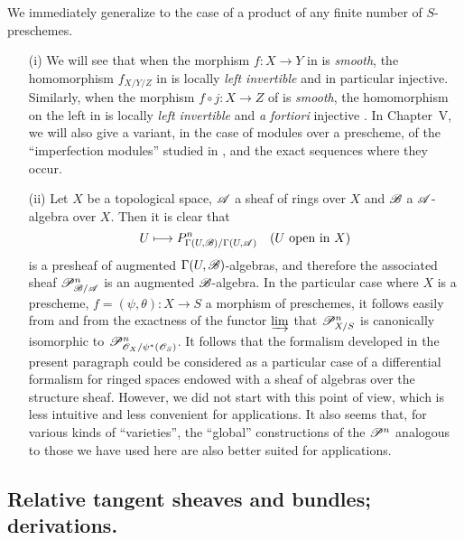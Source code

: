We immediately generalize  to the case of a product of any finite number of $S$-preschemes.

\begin{remarks}[16.4.24]
\label{IV.16.4.24}
\medskip\noindent
\begin{enumerate}
  \item[(i)] We will see  that when the morphism $f: X \to Y$ in  is \emph{smooth}, the homomorphism $f_{X/Y/Z}$ in  is locally \emph{left invertible} and in particular injective.
  Similarly, when the morphism $f \circ j: X \to Z$ of  is \emph{smooth}, the homomorphism on the left in  is locally \emph{left invertible} and \textit{a fortiori} injective .
  In Chapter~V, we will also give a variant, in the case of modules over a prescheme, of the ``imperfection modules'' studied in , and the exact sequences where they occur.
  \item[(ii)] Let $X$ be a topological space, $\mathscr{A}$ a sheaf of  rings over $X$ and $\mathscr{B}$ a $\mathscr{A}$-algebra over $X$.
  Then it is clear that 
  \[
    U \mapsto P_{\Gamma(U, \sh{B})/\Gamma(U, \sh{A})}^n \quad \text{($U$ open in $X$)}
  \]
  is a presheaf of augmented $\Gamma(U, \mathscr{B})$-algebras, and therefore the associated sheaf $\mathscr{P}_{\mathscr{B}/\mathscr{A}}^n$ is an augmented $\mathscr{B}$-algebra.
  In the particular case where $X$ is a prescheme, $f = (\psi, \theta): X \to S$ a morphism of preschemes, it follows easily from  and from the exactness of the functor $\varinjlim$ that $\mathscr{P}_{X/S}^n$ is canonically isomorphic to $\mathscr{P}_{\mathscr{O}_X/\psi^*(\mathscr{O}_S)}^n$.
  It follows that the formalism developed in the present paragraph could be considered as a
  particular case of a differential formalism for ringed spaces endowed with a sheaf of algebras over the structure sheaf.
  However, we did not start with this point of view, which is less intuitive and less convenient for applications.
  It also seems that, for various kinds of ``varieties'', the ``global'' constructions of the $\mathscr{P}^n$ analogous to those we have used here are also better suited for applications.
\end{enumerate}
\end{remarks}

\subsection{Relative tangent sheaves and bundles; derivations.}
\label{IV.16.5}

